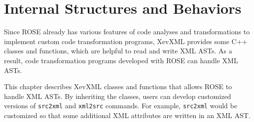 \chapter{Internal Structures and Behaviors}\label{chap:internal}

Since ROSE already has various features of code analyses and
transformations to implement custom code transformation programs, XevXML
provides some C++ classes and functions, which are helpful to read and
write XML ASTs. As a result, code transformation programs developed with
ROSE can handle XML ASTs. 

This chapter describes XevXML classes and functions that allows ROSE to
handle XML ASTs. By inheriting the classes, users can develop customized
versions of \texttt{src2xml} and \texttt{xml2src} commands. For example,
\texttt{src2xml} would be customized so that some additional XML
attributes are written in an XML AST.

